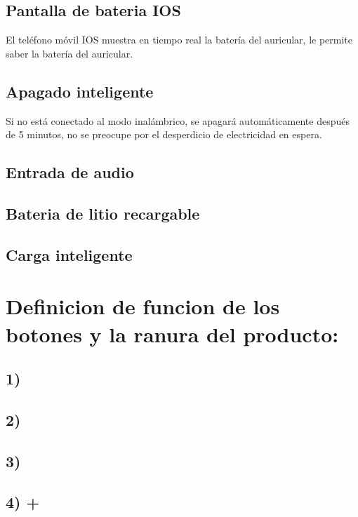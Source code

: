 \documentclass[12pt, letterpaper]{article}
\begin{document}
               \subsection{Pantalla de bateria IOS}
               El teléfono móvil IOS muestra en tiempo real la batería del auricular, le permite saber la batería del auricular.
               \subsection{Apagado inteligente}
               Si no está conectado al modo inalámbrico, se apagará automáticamente después de 5 minutos, no se preocupe por el 
               desperdicio de electricidad en espera.
               \subsection{Entrada de audio}
                
               \subsection{Bateria de litio recargable}
               
               \subsection{Carga inteligente}
               
          \section{Definicion de funcion de los botones y la ranura del producto:}
               \subsection{1) \triangleright\parallel}
               \subsection{2) \triangleright\triangleright\mid}
               \subsection{3) \mid\triangleleft\triangleleft}
               \subsection{4) +}
\end{document}
